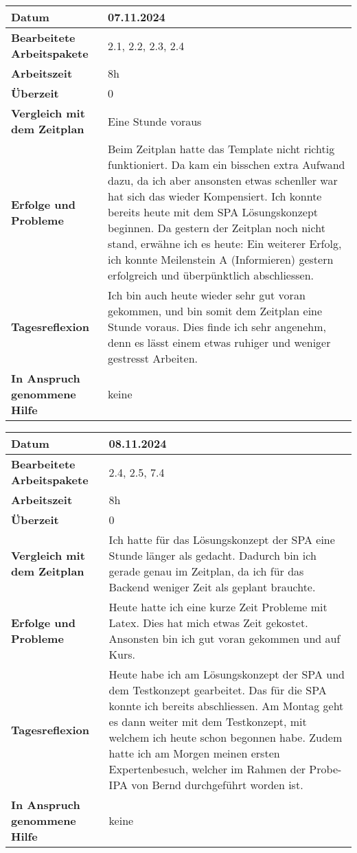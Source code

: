 \begin{longtable}{p{}|p{}}
	\hline
	\textbf{Datum}                       & 07.11.2024 \\
	\hline
	\textbf{Bearbeitete Arbeitspakete}   & 2.1, 2.2, 2.3, 2.4 \\
	\hline
	\textbf{Arbeitszeit}                 & 8h \\
	\hline
	\textbf{Überzeit}                    & 0 \\
	\hline
	\textbf{Vergleich mit dem Zeitplan}  & Eine Stunde voraus \\
	\hline
	\textbf{Erfolge und Probleme}        & Beim Zeitplan hatte das Template nicht richtig funktioniert. Da kam ein bisschen extra Aufwand dazu, da ich aber ansonsten etwas schenller war hat sich das wieder Kompensiert. Ich konnte bereits heute mit dem SPA Lösungskonzept beginnen. Da gestern der Zeitplan noch nicht stand, erwähne ich es heute: Ein weiterer Erfolg, ich konnte
Meilenstein A (Informieren)	gestern erfolgreich und überpünktlich abschliessen.\\
	\hline
	\textbf{Tagesreflexion}              & Ich bin auch heute wieder sehr gut voran gekommen, und bin somit dem Zeitplan eine Stunde voraus. Dies finde ich sehr angenehm, denn es lässt einem etwas ruhiger und weniger gestresst Arbeiten.\\
	\hline
	\textbf{In Anspruch genommene Hilfe} & keine\\
	\hline
\end{longtable}\label{tab:arbeitsprotokoll-tag2}

\newpage

\begin{longtable}{p{}|p{}}
	\hline
	\textbf{Datum}                       & 08.11.2024 \\
	\hline
	\textbf{Bearbeitete Arbeitspakete}   & 2.4, 2.5, 7.4 \\
	\hline
	\textbf{Arbeitszeit}                 & 8h \\
	\hline
	\textbf{Überzeit}                    & 0 \\
	\hline
	\textbf{Vergleich mit dem Zeitplan}  & Ich hatte für das Lösungskonzept der SPA eine Stunde länger als gedacht. Dadurch bin ich gerade genau im Zeitplan, da ich für das Backend weniger Zeit als geplant brauchte. \\
	\hline
	\textbf{Erfolge und Probleme}        & Heute hatte ich eine kurze Zeit Probleme mit Latex. Dies hat mich etwas Zeit gekostet. Ansonsten bin ich gut voran gekommen und auf Kurs.
	\\
	\hline
	\textbf{Tagesreflexion}              & Heute habe ich am Lösungskonzept der SPA und dem Testkonzept gearbeitet. Das für die SPA konnte ich bereits abschliessen. Am Montag geht es dann weiter mit dem Testkonzept, mit welchem ich heute schon begonnen habe. Zudem hatte ich am Morgen meinen ersten Expertenbesuch, welcher im Rahmen der Probe-IPA von Bernd durchgeführt worden ist.
	\\
	\hline
	\textbf{In Anspruch genommene Hilfe} & keine \\
	\hline
\end{longtable}\label{tab:arbeitsprotokoll-tag3}
\newpage

